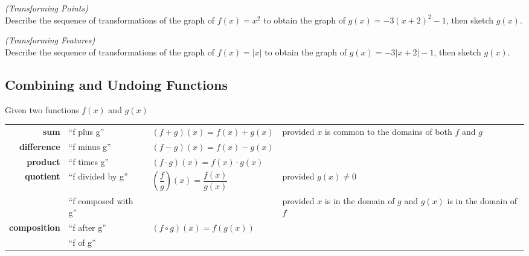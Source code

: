 \vspace*{.25in}


\newpage

\begin{example}
    \textit{(Transforming Points)}\\Describe the sequence of transformations of the graph of $f(x)=x^2$ to obtain the graph of $g(x)=-3(x+2)^2 -1$, then sketch $g(x)$.    
\end{example}
\begin{example}
    \textit{(Transforming Features)}\\Describe the sequence of transformations of the graph of $f(x)=|x|$ to obtain the graph of $g(x)=-3|x+2|-1$, then sketch $g(x)$.
\end{example}

\newpage

\subsection{Combining and Undoing Functions}
\begin{definition}
    Given two functions $f(x)$ and $g(x)$\\
\end{definition}    
    \renewcommand{\arraystretch}{3}
    
    \begin{tabular}{rllp{4cm}}\hline
        \textbf{sum} &  ``f plus g'' & $(f+g)(x)=f(x)+g(x)$ & \multirow{3}{4cm}{provided $x$ is common to the domains of both $f$ and $g$}\\
        \textbf{difference} & ``f minus g'' & $(f-g)(x)=f(x)-g(x)$\\
        \textbf{product} & ``f times g'' & $(f\cdot g)(x)=f(x)\cdot g(x)$\\\hline
        \textbf{quotient} & ``f divided by g'' & $\left(\dfrac{f}{g}\right)(x)=\dfrac{f(x)}{g(x)}$ & provided $g(x)\neq0$\\\hline
        & ``f composed with g'' & & \multirow{3}{4cm}{provided $x$ is in the domain of $g$ and $g(x)$ is in the domain of $f$}\\
        \textbf{composition} & ``f after g''&$(f\circ g)(x)=f(g(x))$\\
        & ``f of g''&\\\hline
    \end{tabular}

